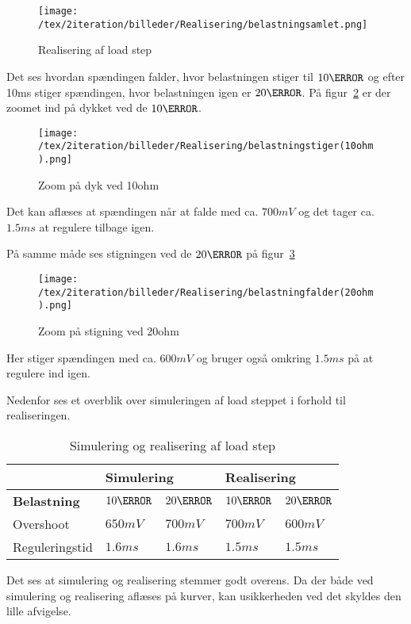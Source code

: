 \begin{figure}[H]
	\center
	\texttt{[image: /tex/2iteration/billeder/Realisering/belastningsamlet.png]}
	\caption{Realisering af load step}
	\label{fig:belastningsamlet}
\end{figure}

Det ses hvordan spændingen falder, hvor belastningen stiger til $10\ohm$ og efter 10ms stiger spændingen, hvor belastningen igen er $20\ohm$. På figur~\ref{fig:belastning_10ohm} er der zoomet ind på dykket ved de $10\ohm$. 
\begin{figure}[H]
	\center
	\texttt{[image: /tex/2iteration/billeder/Realisering/belastningstiger(10ohm).png]}
	\caption{Zoom på dyk ved 10ohm}
	\label{fig:belastning_10ohm}
\end{figure}

\noindent Det kan aflæses at spændingen når at falde med ca. $700mV$ og det tager ca. $1.5ms$ at regulere tilbage igen.

\noindent På samme måde ses stigningen ved de $20\ohm$ på figur~\ref{fig:belastning_20ohm}
\begin{figure}[H]
	\center
	\texttt{[image: /tex/2iteration/billeder/Realisering/belastningfalder(20ohm).png]}
	\caption{Zoom på stigning ved 20ohm}
	\label{fig:belastning_20ohm}
\end{figure}
\noindent Her stiger spændingen med ca. $600mV$ og bruger også omkring $1.5ms$ på at regulere ind igen. 

\noindent Nedenfor ses et overblik over simuleringen af load steppet i forhold til realiseringen. 

\begin{table}[H] 			
	\centering
	\begin{tabularx}{\textwidth}{|X|l|l|l|l|}
		\hline
		& \multicolumn{2}{|l|}{\textbf{Simulering}} & \multicolumn{2}{|l|}{\textbf{Realisering}} \\ \hline
		\textbf{Belastning} & $10\ohm$ & $20\ohm$ & $10\ohm$ & $20\ohm$ \\ \hline
		Overshoot & $650mV$ & $700mV$ & $700mV$ & $600mV$  \\ \hline
		Reguleringstid & $1.6ms$ & $1.6ms$ & $1.5ms$ & $1.5ms$ \\ \hline
	\end{tabularx}
	\caption{Simulering og realisering af load step}
	\label{tab:Loadstep}
\end{table}
\noindent Det ses at simulering og realisering stemmer godt overens. Da der både ved simulering og realisering aflæses på kurver, kan usikkerheden ved det skyldes den lille afvigelse.


















